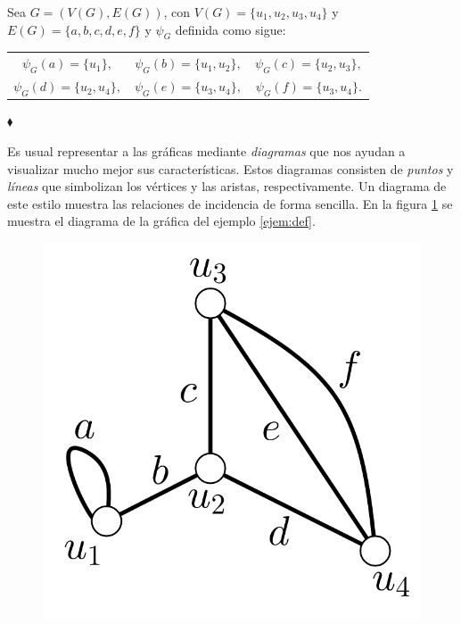 \begin{ejem} \label{ejem:def}
Sea $G=(V(G),E(G))$, con $V(G)=\{u_{1}, u_{2},u_{3},u_{4}\}$ y $E(G)=\{a,b,c,d,e,f\}$ y $\psi_{G}$ definida como sigue:

\begin{center}
\begin{tabular}{ c c c }
$\psi_{G}(a) = \{u_{1}\},$& $\psi_{G}(b) = \{u_{1},u_{2}\},$ & $\psi_{G}(c) = \{u_{2},u_{3}\},$  \\
$\psi_{G}(d) = \{u_{2},u_{4}\},$  & $\psi_{G}(e) = \{u_{3},u_{4}\},$  & $\psi_{G}(f) = \{u_{3},u_{4}\}.$ 
\end{tabular}
\end{center}

\hfill $\blacklozenge$
\end{ejem}
Es usual representar a las gráficas mediante \textit{diagramas}  que nos ayudan a visualizar mucho mejor sus características. Estos diagramas consisten de \textit{puntos} y \textit{líneas} que simbolizan los vértices y las aristas, respectivamente. Un diagrama de este estilo muestra las relaciones de incidencia de forma sencilla. En la figura \ref{fig:diagrama} se muestra el diagrama de la gráfica del ejemplo \ref{ejem:def}.

\begin{figure}[h]
    \centering
    \includegraphics[scale=0.23]{img/imgchapter1/GrafoDefinicion.jpg}
    \caption{}
    \label{fig:diagrama}
\end{figure}

